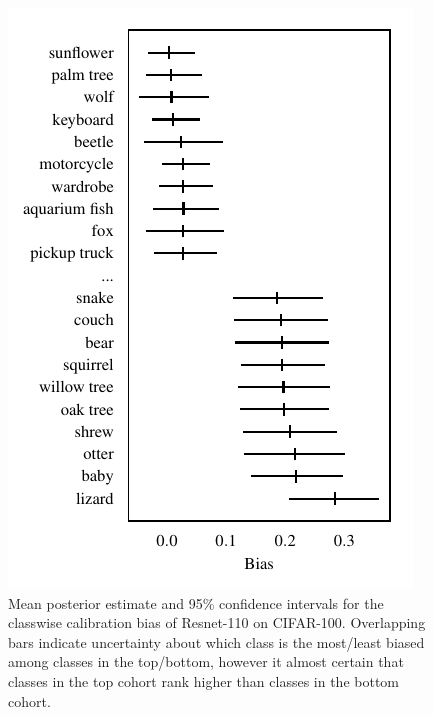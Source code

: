 \documentclass{article}
\begin{document}
\begin{figure}[t]
    \centering
    \includegraphics{figures/cifar100_bias.pdf}  
    \caption{
        Mean posterior estimate and 95\% confidence intervals for the classwise calibration bias of Resnet-110 on CIFAR-100.
        Overlapping bars indicate uncertainty about which class is the most/least biased among classes in the top/bottom, however it almost certain that classes in the top cohort rank higher than classes in the bottom cohort.
    }
    \label{fig:cifar_bias}
\end{figure}
\end{document}
